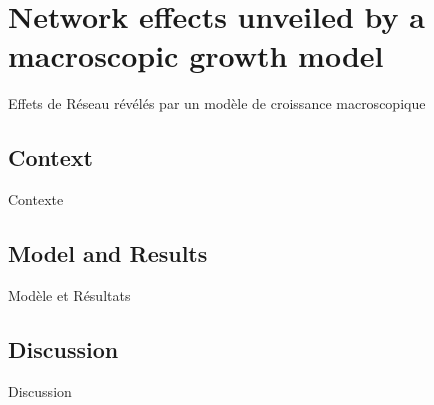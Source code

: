 



\newpage



\section[Unveiling Network Effects][Effets de Réseaux]{Network effects unveiled by a macroscopic growth model}{Effets de Réseau révélés par un modèle de croissance macroscopique}

\label{sec:interactiongibrat}







\subsection{Context}{Contexte}




\subsection{Model and Results}{Modèle et Résultats}




\subsection{Discussion}{Discussion}

